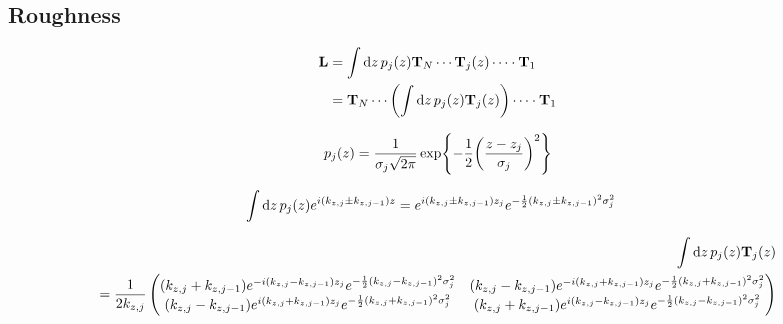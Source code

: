 


\subsection{Roughness} %
\label{sub:roughness}

\begin{align*}
	\vb{L} & = \int\dd{z} p_j\pqty{z}\vb{T}_N\cdots\vb{T}_j\pqty{z}\cdots\cdot\vb{T}_{1}        \\
	       & = \vb{T}_N\cdots\pqty{\int\dd{z} p_j\pqty{z}\vb{T}_j\pqty{z}}\cdots\cdot\vb{T}_{1}
\end{align*}

\begin{align*}
	p_j\pqty{z} = \frac{1}{\sigma_j\sqrt{2\pi}}\exp{-\frac{1}{2}\pqty{\frac{z - z_j}{\sigma_j}}^2}
\end{align*}

\begin{align*}
	\int\dd{z}p_j\pqty{z}e^{i\pqty{k_{z,j} \pm k_{z,j-1}}z} & =
	e^{i\pqty{k_{z,j} \pm k_{z,j-1}}z_j}
	e^{-\frac{1}{2}\pqty{k_{z,j} \pm k_{z,j-1}}^2\sigma_j^2}
\end{align*}

\begin{align*}
	\int\dd{z}p_j\pqty{z} \vb{T}_j\pqty{z}                   \\= \frac{1}{2k_{z,j}}\pmqty{
	\pqty{k_{z,j} + k_{z,j-1}}e^{-i\pqty{k_{z,j} - k_{z,j-1}}z_j}
	e^{-\frac{1}{2}\pqty{k_{z,j} - k_{z,j-1}}^2\sigma_j^2} &
	\pqty{k_{z,j} - k_{z,j-1}}e^{-i\pqty{k_{z,j} + k_{z,j-1}}z_j}
	e^{-\frac{1}{2}\pqty{k_{z,j} + k_{z,j-1}}^2\sigma_j^2}   \\
	\pqty{k_{z,j} - k_{z,j-1}}e^{ i\pqty{k_{z,j} + k_{z,j-1}}z_j}
	e^{-\frac{1}{2}\pqty{k_{z,j} + k_{z,j-1}}^2\sigma_j^2} &
	\pqty{k_{z,j} + k_{z,j-1}}e^{ i\pqty{k_{z,j} - k_{z,j-1}}z_j}
	e^{-\frac{1}{2}\pqty{k_{z,j} - k_{z,j-1}}^2\sigma_j^2}
	}
\end{align*}

